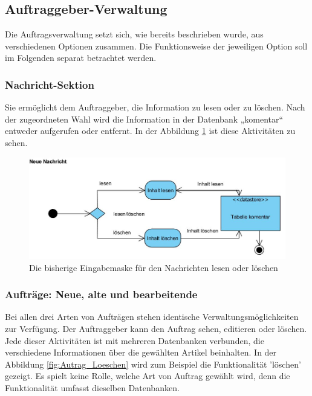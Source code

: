 \subsection{Auftraggeber-Verwaltung}

Die Auftragsverwaltung setzt sich, wie bereits beschrieben wurde, aus verschiedenen Optionen zusammen. Die Funktionsweise der jeweiligen Option soll im Folgenden separat betrachtet werden.
	
\subsubsection{Nachricht-Sektion} 

Sie ermöglicht dem Auftraggeber, die Information zu lesen oder zu löschen. Nach der zugeordneten Wahl wird die Information in der Datenbank „komentar“ entweder aufgerufen oder entfernt. In der Abbildung \ref{fig:lesenLoeschen} ist diese Aktivitäten zu sehen.

\begin{figure}[h]
	\centering
	\includegraphics[width=0.8\linewidth]{Graphics/NeueNachricht.JPG}
	\caption[Kommunikation]{Die bisherige Eingabemaske für den Nachrichten lesen oder löschen}
	\label{fig:lesenLoeschen}
\end{figure}



\subsubsection{Aufträge: Neue, alte und bearbeitende}

Bei allen drei Arten von Aufträgen stehen identische Verwaltungsmöglichkeiten zur Verfügung. Der Auftraggeber kann den Auftrag sehen, editieren oder löschen. Jede dieser Aktivitäten ist mit mehreren Datenbanken verbunden, die verschiedene Informationen über die gewählten Artikel beinhalten. In der Abbildung \ref{fig:Autrag_Loeschen} wird zum Beispiel die Funktionalität ’löschen’ gezeigt. Es spielt keine Rolle, welche Art von Auftrag gewählt wird, denn die Funktionalität umfasst dieselben Datenbanken.

